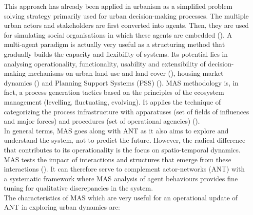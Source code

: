 \documentclass[11pt]{report}
\begin{document}
This approach has already been applied in urbanism as a simplified problem solving strategy primarily used for urban decision-making processes. The multiple urban actors and stakeholders are first converted into agents. Then, they are used for simulating social organisations in which these agents are embedded (\href{Bousquet}{\citealt{bousquet_multi-agent_2004}}). A multi-agent paradigm is actually very useful as a structuring method that gradually builds the capacity and flexibility of systems.
Its potential lies in analysing  operationality, functionality, usability and extensibility of decision-making mechanisms on urban land use and land cover (\cite{(D. Brown et al. 2005)}), housing market dynamics (\citealt{(Diappi and Bolchi 2008)}) and Planning Support Systems (PSS) (\citealt{(Saarloos et al. 2008)}). MAS methodology is, in fact, a process generation tactics based on the principles of the ecosystem management (levelling, fluctuating, evolving). It applies the technique of categorizing the process infrastructure with apparatuses (set of fields of influences and major forces) and procedures (set of operational agencies) (\href{Bousquet}{\citealt{bousquet_multi-agent_2004}}).
\\

In general terms, MAS goes along with ANT as it also aims to explore and understand the system, not to predict the future.
However, the radical difference that contributes to its operationality is the focus on spatio-temporal dynamics. MAS tests the impact of interactions and structures that emerge from these interactions (\citealt{(Crooks, Patel, and Wise 2014)}). It can therefore serve to complement actor-networks (ANT) with a systematic framework where MAS analysis of agent behaviours provides fine tuning for qualitative discrepancies in the system. 
\\

The characteristics of MAS which are very useful for an operational update of ANT in exploring urban dynamics are:
\end{document}
